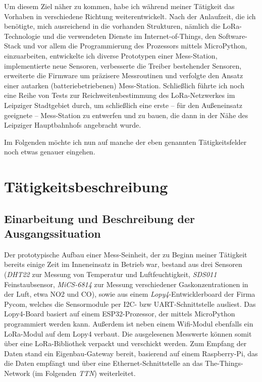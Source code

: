 \documentclass[a4paper,11pt]{article}
\begin{document}
Um diesem Ziel näher zu kommen, habe ich während meiner Tätigkeit das Vorhaben
in verschiedene Richtung weiterentwickelt. Nach der Anlaufzeit, die ich
benötigte, mich ausreichend in die vorhanden Strukturen, nämlich die
LoRa-Technologie und die verwendeten Dienste im Internet-of-Things, den
Software-Stack und vor allem die Programmierung des Prozessors mittels
MicroPython, einzuarbeiten, entwickelte ich diverse Prototypen einer
Mess-Station, implementierte neue Sensoren, verbesserte die Treiber bestehender
Sensoren, erweiterte die Firmware um präzisere Messroutinen und verfolgte den
Ansatz einer autarken (batteriebetriebenen) Mess-Station. Schließlich führte
ich noch eine Reihe von Tests zur Reichweitenbestimmung des LoRa-Netzwerkes im
Leipziger Stadtgebiet durch, um schließlich eine erste -- für den Außeneinsatz
geeignete -- Mess-Station zu entwerfen und zu bauen, die dann in der Nähe des
Leipziger Hauptbahnhofs angebracht wurde.

Im Folgenden möchte ich nun auf manche der eben genannten Tätigkeitsfelder
noch etwas genauer eingehen.

\section{Tätigkeitsbeschreibung}
\subsection{Einarbeitung und Beschreibung der Ausgangssituation}

Der prototypische Aufbau einer Mess-Seinheit, der zu Beginn meiner Tätigkeit
bereits einige Zeit im Inneneinsatz in Betrieb war, bestand aus drei Sensoren
(\textit{DHT22} zur Messung von Temperatur und Luftfeuchtigkeit,
\textit{SDS011} Feinstaubsensor, \textit{MiCS-6814} zur Messung verschiedener
Gaskonzentrationen in der Luft, etwa NO2 und CO), sowie aus einem
\textit{Lopy4}-Entwicklerboard der Firma Pycom, welches die Sensormodule per
I2C- bzw UART-Schnittstelle ausliest. Das Lopy4-Board basiert auf einem
ESP32-Prozessor, der mittels MicroPython programmiert werden kann. Außerdem
ist neben einem Wifi-Modul ebenfalls ein LoRa-Modul auf dem Lopy4 verbaut. Die
ausgelesenen Messwerte können somit über eine LoRa-Bibliothek verpackt und
verschickt werden. Zum Empfang der Daten stand ein Eigenbau-Gateway bereit,
basierend auf einem Raspberry-Pi, das die Daten empfängt und über eine
Ethernet-Schnittstelle an das The-Things-Network (im Folgenden \textit{TTN})
weiterleitet.
\end{document}
